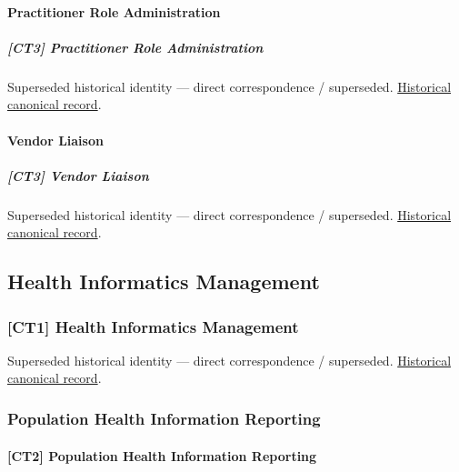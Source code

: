 \paragraph{Practitioner Role Administration}

\subparagraph{[CT3] Practitioner Role Administration}

\par\label{element:6b777f1201db474eb22dd89f2b1f68c6}
Superseded historical identity — direct correspondence / superseded. \href{../../../../continuum/strategy/capability/6b777f1201db474eb22dd89f2b1f68c6.md}{Historical canonical record}.\par

\paragraph{Vendor Liaison}

\subparagraph{[CT3] Vendor Liaison}

\par\label{element:29076cbb9fc5442fb25faf43947574f7}
Superseded historical identity — direct correspondence / superseded. \href{../../../../continuum/strategy/capability/29076cbb9fc5442fb25faf43947574f7.md}{Historical canonical record}.\par

\subsection{Health Informatics Management}

\subsubsection{[CT1] Health Informatics Management}

\par\label{element:50c56bac0dc540a2b392fc2376efc129}
Superseded historical identity — direct correspondence / superseded. \href{../../../../continuum/strategy/capability/50c56bac0dc540a2b392fc2376efc129.md}{Historical canonical record}.\par

\subsubsection{Population Health Information Reporting}

\paragraph{[CT2] Population Health Information Reporting}


